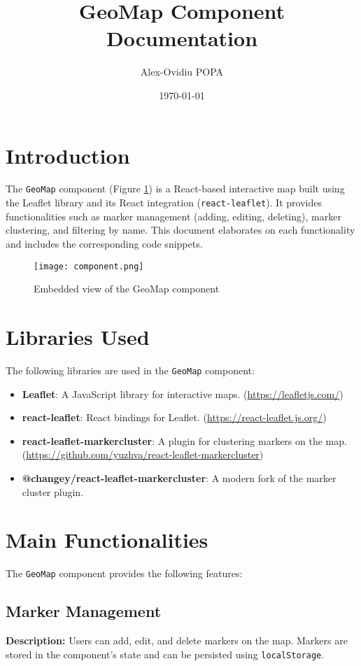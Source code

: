 \documentclass[11pt]{article}
\begin{document}
    \title{GeoMap Component Documentation}
    \author{Alex-Ovidiu POPA}
    \date{\today}
    \maketitle

    \section{Introduction}
    The \texttt{GeoMap} component (Figure \ref{fig:enter-label}) is a React-based interactive map built using the Leaflet library and its React integration (\texttt{react-leaflet}). It provides functionalities such as marker management (adding, editing, deleting), marker clustering, and filtering by name. This document elaborates on each functionality and includes the corresponding code snippets.
    \begin{figure}
        \centering
        \texttt{[image: component.png]}
        \caption{Embedded view of the GeoMap component}
        \label{fig:enter-label}
    \end{figure}

    \section{Libraries Used}
    The following libraries are used in the \texttt{GeoMap} component:
    \begin{itemize}
        \item \textbf{Leaflet}: A JavaScript library for interactive maps. (\url{https://leafletjs.com/})
        \item \textbf{react-leaflet}: React bindings for Leaflet. (\url{https://react-leaflet.js.org/})
        \item \textbf{react-leaflet-markercluster}: A plugin for clustering markers on the map. (\url{https://github.com/yuzhva/react-leaflet-markercluster})
        \item \textbf{@changey/react-leaflet-markercluster}: A modern fork of the marker cluster plugin.
    \end{itemize}

    \section{Main Functionalities}
    The \texttt{GeoMap} component provides the following features:

    \subsection{Marker Management}
    \textbf{Description:} Users can add, edit, and delete markers on the map. Markers are stored in the component's state and can be persisted using \texttt{localStorage}.
\end{document}

